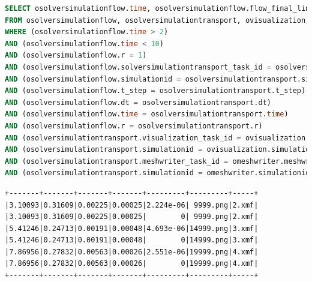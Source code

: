 \begin{lstlisting}[language=sql,deletendkeywords={TIME},label={lst:experiments-3c-sql},caption={[Código em SQL gerado na consulta~\#3C]Código em SQL gerado na consulta~\#3C. Tempo médio de geração: 43,20~ms.}]
SELECT osolversimulationflow.time, osolversimulationflow.flow_final_linear_residual, osolversimulationflow.flow_norm_delta_u, osolversimulationtransport.transport_final_linear_residual, osolversimulationtransport.transport_norm_delta_u, ovisualization.png, omeshwriter.xdmf
FROM osolversimulationflow, osolversimulationtransport, ovisualization, omeshwriter
WHERE (osolversimulationflow.time > 2) 
AND (osolversimulationflow.time < 10) 
AND (osolversimulationflow.r = 1) 
AND (osolversimulationflow.solversimulationtransport_task_id = osolversimulationtransport.solversimulationtransport_task_id) 
AND (osolversimulationflow.simulationid = osolversimulationtransport.simulationid) 
AND (osolversimulationflow.t_step = osolversimulationtransport.t_step) 
AND (osolversimulationflow.dt = osolversimulationtransport.dt) 
AND (osolversimulationflow.time = osolversimulationtransport.time) 
AND (osolversimulationflow.r = osolversimulationtransport.r) 
AND (osolversimulationtransport.visualization_task_id = ovisualization.visualization_task_id) 
AND (osolversimulationtransport.simulationid = ovisualization.simulationid) 
AND (osolversimulationtransport.meshwriter_task_id = omeshwriter.meshwriter_task_id) 
AND (osolversimulationtransport.simulationid = omeshwriter.simulationid);
\end{lstlisting}

\begin{lstlisting}[language=sqlresults,label={lst:experiments-3c-sqlresults},caption={[Versão simplificada dos resultados da consulta \#3C.]Resultados da consulta \#3C. Tempo médio de execução: 11,88~ms.}]
+-------+-------+-------+-------+---------+---------+-----+
|3.10093|0.31609|0.00225|0.00025|2.224e-06| 9999.png|2.xmf|
|3.10093|0.31609|0.00225|0.00025|        0| 9999.png|2.xmf|
|5.41246|0.24713|0.00191|0.00048|4.693e-06|14999.png|3.xmf|
|5.41246|0.24713|0.00191|0.00048|        0|14999.png|3.xmf|
|7.86956|0.27832|0.00563|0.00026|2.551e-06|19999.png|4.xmf|
|7.86956|0.27832|0.00563|0.00026|        0|19999.png|4.xmf|
+-------+-------+-------+-------+---------+---------+-----+
\end{lstlisting}

